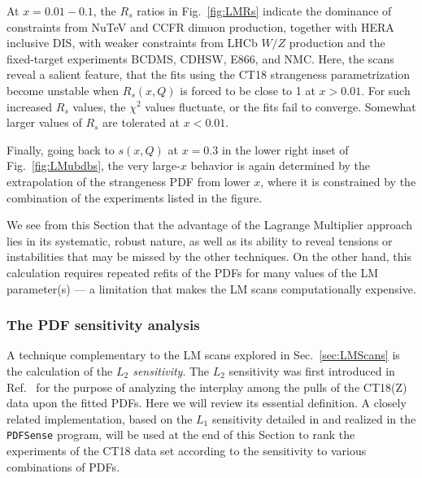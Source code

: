 At $x=0.01\!-\!0.1$, the $R_s$ ratios in Fig.~\ref{fig:LMRs} indicate the
dominance of constraints from NuTeV and CCFR dimuon production,
together with HERA inclusive DIS, with weaker constraints from
LHCb $W/Z$ production
and the fixed-target experiments BCDMS, CDHSW, E866, and NMC. Here, the scans
reveal a salient feature, that the fits using the CT18
strangeness parametrization become unstable when $R_s(x,Q)$ is forced
to be close to 1 at $x > 0.01$. For such increased $R_s$ values, the
$\chi^2$ values fluctuate, or the fits fail to converge. Somewhat
larger values of $R_s$ are tolerated at $x < 0.01$. 

Finally, going back to $s(x,Q)$ at $x=0.3$ in the lower right inset of
Fig.~\ref{fig:LMubdbs}, the very large-$x$ behavior is again
determined by the extrapolation of the strangeness PDF from lower $x$,
where it is constrained by the combination of the experiments listed
in the figure. 

We see from this Section that the advantage of the Lagrange Multiplier approach lies in its systematic, robust nature, as well as its ability to reveal tensions or
instabilities that may be missed by the other techniques.
On the other hand, this calculation requires repeated refits
of the PDFs for many values of the LM parameter(s) ---
a limitation that makes the LM scans computationally expensive.

\subsubsection{The PDF sensitivity analysis
\label{sec:L2}
}
A technique complementary to the LM scans explored in Sec.~\ref{sec:LMScans}
is the calculation of the {\it $L_2$ sensitivity}. The $L_2$ sensitivity was
first introduced in Ref.~\cite{Hobbs:2019gob} for the purpose of analyzing
the interplay among the pulls of the CT18(Z) data upon the fitted PDFs.
Here we will review its essential definition. A closely related
implementation, based on the $L_1$ sensitivity detailed
in \cite{Wang:2018heo} and realized in the \texttt{PDFSense} program,
will be used at the end of this Section to rank the experiments of the
CT18 data set according to the sensitivity to various combinations of PDFs.
  
